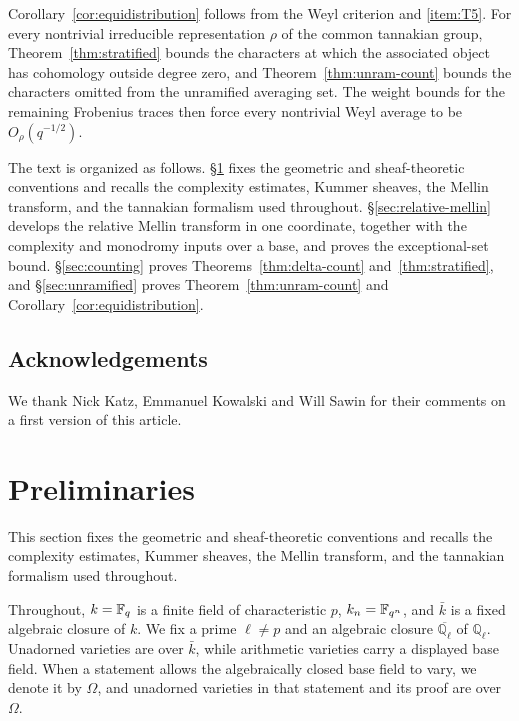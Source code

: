 \documentclass[12pt,reqno]{amsart}
\theoremstyle{definition}
\theoremstyle{plain}
\theoremstyle{definition}
\theoremstyle{remark}
\newcommand{\bbQ}{\mathbb{Q}}  \newcommand{\bbR}{\mathbb{R}}
\newcommand{\ol}[1]{\overline{#1}}
\newcommand{\Ql}{\bbQ_{\ell}}
\begin{document}
Corollary~\ref{cor:equidistribution} follows from the Weyl criterion and \ref{item:T5}.  For every
nontrivial irreducible representation \(\rho\) of the common tannakian group,
Theorem~\ref{thm:stratified} bounds the characters at which the associated object has cohomology
outside degree zero, and Theorem~\ref{thm:unram-count} bounds the characters omitted from the
unramified averaging set.  The weight bounds for the remaining Frobenius traces then force every
nontrivial Weyl average to be \(O_\rho(q^{-1/2})\).

The text is organized as follows. \S\ref{sec:preliminaries} fixes the geometric and sheaf-theoretic conventions and recalls the complexity
estimates, Kummer sheaves, the Mellin transform, and the tannakian formalism used throughout.
\S\ref{sec:relative-mellin}
develops the relative Mellin transform in one coordinate, together with the complexity and
monodromy inputs over a base, and proves the exceptional-set bound.
\S\ref{sec:counting} proves Theorems~\ref{thm:delta-count} and~\ref{thm:stratified}, and
\S\ref{sec:unramified} proves Theorem~\ref{thm:unram-count} and
Corollary~\ref{cor:equidistribution}.

\subsection*{Acknowledgements}

We thank Nick Katz, Emmanuel Kowalski and Will Sawin for their comments on a first version of this
article.

\section{Preliminaries}
\label{sec:preliminaries}

This section fixes the geometric and sheaf-theoretic conventions and recalls the complexity estimates,
Kummer sheaves, the Mellin transform, and the tannakian formalism used throughout.

Throughout, \(k=\mathbb{F}_q\) is a finite field of characteristic \(p\), \(k_n=\mathbb{F}_{q^n}\), and \(\bar k\) is
a fixed algebraic closure of \(k\).  We fix a prime \(\ell\neq p\) and an algebraic closure \(\ol\Ql\) of
\(\mathbb Q_\ell\).  Unadorned varieties are over \(\bar k\), while arithmetic varieties carry a
displayed base field.  When a statement allows the algebraically closed base field to vary, we denote it
by \(\Omega\), and unadorned varieties in that statement and its proof are over \(\Omega\).
\end{document}

